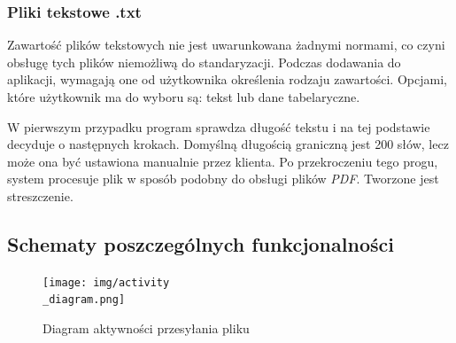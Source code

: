 \documentclass[12pt,a4paper,twoside]{article}
\begin{document}
\subsubsection*{Pliki tekstowe .txt}
Zawartość plików tekstowych nie jest uwarunkowana żadnymi normami, co czyni obsługę tych plików niemożliwą do standaryzacji. Podczas dodawania do aplikacji, wymagają one od użytkownika określenia rodzaju zawartości. Opcjami, które użytkownik ma do wyboru są: tekst lub dane tabelaryczne.\par
W pierwszym przypadku program sprawdza długość tekstu i na tej podstawie decyduje o następnych krokach. Domyślną długością graniczną jest 200 słów, lecz może ona być ustawiona manualnie przez klienta. Po przekroczeniu tego progu, system procesuje plik w sposób podobny do obsługi plików \textit{PDF}. Tworzone jest streszczenie.\par
\newpage
\subsection{Schematy poszczególnych funkcjonalności}
\begin{figure}[h!]
\centering
  \texttt{[image: img/activity\\\_diagram.png]}
  \caption{Diagram aktywności przesyłania pliku}
\end{figure}
\newpage
\end{document}
